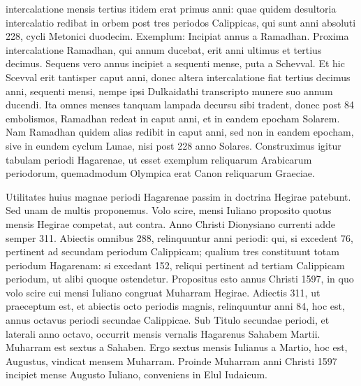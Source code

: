 intercalatione mensis tertius itidem erat primus anni: quae quidem
desultoria intercalatio redibat in orbem post tres periodos Calippicas,
qui sunt anni absoluti 228, cycli Metonici duodecim.
Exemplum:
Incipiat annus a Ramadhan.
Proxima intercalatione Ramadhan,
qui annum ducebat, erit anni ultimus et tertius decimus.
Sequens
vero annus incipiet a sequenti mense, puta a Schevval.
Et hic Scevval
erit tantisper caput anni, donec altera intercalatione fiat tertius
decimus anni, sequenti mensi, nempe ipsi Dulkaidathi transcripto
munere suo annum ducendi.
Ita omnes menses tanquam lampada
decursu sibi tradent, donec post 84 embolismos, Ramadhan redeat
in caput anni, et in eandem epocham Solarem.
Nam Ramadhan
quidem alias redibit in caput anni, sed non in eandem epocham, sive
in eundem cyclum Lunae, nisi post 228 anno Solares.
Construximus
igitur tabulam periodi Hagarenae, ut esset exemplum reliquarum
Arabicarum periodorum, quemadmodum Olympica erat Canon reliquarum
Graeciae.
%

\bigskip %

%
Utilitates huius magnae periodi Hagarenae passim in doctrina
Hegirae patebunt.
Sed unam de multis proponemus.
Volo scire,
mensi Iuliano proposito quotus mensis Hegirae competat, aut contra.
Anno Christi Dionysiano currenti adde semper 311.
Abiectis omnibus
288, relinquuntur anni periodi: qui, si excedent 76, pertinent ad
secundam periodum Calippicam; qualium tres constituunt totam periodum
Hagarenam: si excedant 152, reliqui pertinent ad tertiam Calippicam
periodum, ut alibi quoque ostendetur.
%
Propositus esto annus
Christi 1597, in quo volo scire cui mensi Iuliano congruat Muharram
Hegirae.
Adiectis 311, ut praeceptum est, et abiectis octo periodis magnis,
relinquuntur anni 84, hoc est, annus octavus periodi secundae %
Calippicae.
Sub Titulo secundae periodi, et laterali anno octavo, occurrit
mensis vernalis Hagarenus Sahabem  Martii.
Muharram est sextus
a Sahaben.
Ergo sextus mensis Iulianus a Martio, hoc est, Augustus, vindicat
mensem Muharram.
Proinde Muharram anni Christi 1597 incipiet
mense Augusto Iuliano, conveniens in Elul Iudaicum.
%
